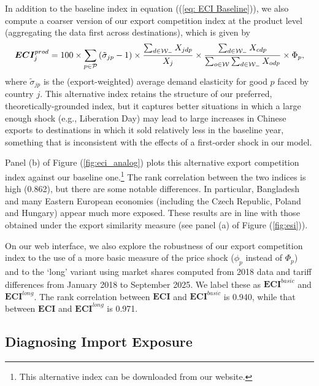 \documentclass[english,12pt]{article}
\theoremstyle{definition}
\let\oldref\ref
\renewcommand{\ref}[1]{(\oldref{#1})}
\begin{document}
In addition to the baseline index in equation (\ref{eq: ECI Baseline}), we 
also compute a coarser
version of our export competition index at the product level (aggregating
the data first across destinations), which is given by 
\begin{equation}
\boldsymbol{ECI}_{j}^{prod}= 100 \times \sum_{p\in \mathcal{P}}\left(\tilde{\sigma}_{jp}-1\right)\times
\frac{\sum_{d\in \mathcal{W}_{-}}X_{jdp}}{%
X_{j}}\times \frac{%
\sum_{d\in \mathcal{W}_{-}}X_{cdp}}{\sum_{o\in \mathcal{W}}\sum_{d\in 
\mathcal{W}_{-}}X_{odp}}\times\Phi _{p},  \label{eq: ECI_prod}
\end{equation}%
where $\tilde{\sigma}_{jp}$ is the (export-weighted) average demand elasticity
for good $p$ faced by country $j$. This alternative index retains 
the structure of our preferred,
theoretically-grounded index, but it captures better situations in which a
large enough shock (e.g., Liberation Day) may lead to large increases in
Chinese exports to destinations in which it sold relatively less in the
baseline year, something that is inconsistent with the effects of a
first-order shock in our model.

Panel (b) of Figure \ref{fig:eci_analog} plots this alternative export competition
index against our baseline one.\footnote{This alternative index can be downloaded
from our website.} The rank correlation between the two indices is 
high (0.862), but there are some notable differences. In particular, Bangladesh 
and many Eastern European economies (including the Czech Republic, Poland and Hungary)
appear much more exposed. These results are in line with those obtained
under the export similarity measure (see panel (a) of Figure \ref{fig:esi}).

On our web interface, we also explore the robustness of our export competition index
to the use of a more basic measure of the price shock ($\phi_{p}$ instead of 
$\Phi_{p}$) and to the `long' variant using market shares computed from 
2018 data and tariff differences from January 2018 to September 2025. We label
these as $\boldsymbol{ECI}^{basic}$ and $\boldsymbol{ECI}^{long}$. The rank correlation
between $\boldsymbol{ECI}$ and $\boldsymbol{ECI}^{basic}$ is 0.940, while that 
between $\boldsymbol{ECI}$ and $\boldsymbol{ECI}^{long}$ is 0.971.


\subsection{Diagnosing Import Exposure\label{Sec: Import Competition}}
\end{document}
